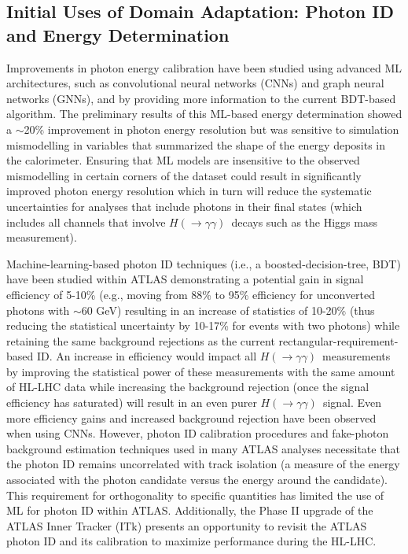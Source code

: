 \documentclass[letter, USenglish, 11pt, subfigure]{article}
\newcommand{\hyy}{\ensuremath{H(\to\gamma\gamma)}}
\begin{document}
\subsection{Initial Uses of Domain Adaptation: Photon ID and Energy Determination}

Improvements in photon energy calibration have been studied using advanced ML architectures, such as convolutional neural networks (CNNs) and graph neural networks (GNNs), and by providing more information to the current BDT-based algorithm. The preliminary results of this ML-based energy determination showed a $\sim$20\% improvement in photon energy resolution but was sensitive to simulation mismodelling in variables that summarized the shape of the energy deposits in the calorimeter. Ensuring that ML models are insensitive to the observed mismodelling in certain corners of the dataset could result in significantly improved photon energy resolution which in turn will reduce the systematic uncertainties for analyses that include photons in their final states (which includes all channels that involve \hyy\ decays such as the Higgs mass measurement).

Machine-learning-based photon ID techniques (i.e., a boosted-decision-tree, BDT) have been studied within ATLAS demonstrating a potential gain in signal efficiency of 5-10\% (e.g., moving from 88\% to 95\% efficiency for unconverted photons with \pt$\sim$60 GeV) resulting in an increase of statistics of 10-20\% (thus reducing the statistical uncertainty by 10-17\% for events with two photons) while retaining the same background rejections as the current rectangular-requirement-based ID. An increase in efficiency would impact all \hyy\  measurements by improving the statistical power of these measurements with the same amount of HL-LHC data while increasing the background rejection (once the signal efficiency has saturated) will result in an even purer \hyy\  signal. Even more efficiency gains and increased background rejection have been observed when using CNNs. However, photon ID calibration procedures and fake-photon background estimation techniques used in many ATLAS analyses necessitate that the photon ID remains uncorrelated with track isolation (a measure of the energy associated with the photon candidate versus the energy around the candidate). This requirement for orthogonality to specific quantities has limited the use of ML for photon ID within ATLAS. Additionally, the Phase II upgrade of the ATLAS Inner Tracker (ITk) presents an opportunity to revisit the ATLAS photon ID and its calibration to maximize performance during the HL-LHC.
\end{document}
